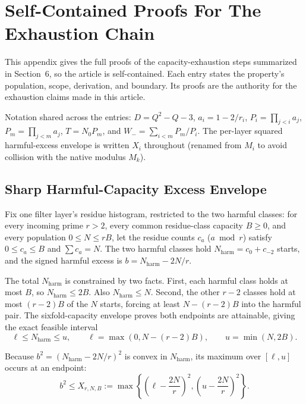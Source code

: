 \section{Self-Contained Proofs For The Exhaustion Chain}
\label{sec:appendix-c-proofs}

This appendix gives the full proofs of the capacity-exhaustion steps
summarized in Section~6, so the article is self-contained. Each entry states the
property's population, scope, derivation, and boundary. Its proofs are the
authority for the exhaustion claims made in this article.

Notation shared across the entries: $D=Q^2-Q-3$, $a_i=1-2/r_i$,
$P_i=\prod_{j<i}a_j$, $P_m=\prod_{j<m}a_j$, $T=N_0P_m$, and
$W_-=\sum_{i<m}P_m/P_i$. The per-layer squared harmful-excess envelope is
written $X_i$ throughout (renamed from $M_i$ to avoid collision with the native modulus $M_k$).

\subsection{Sharp Harmful-Capacity Excess Envelope}
\label{sec:appendix-c-1}

Fix one filter layer's residue histogram, restricted to the two harmful
classes: for every incoming prime $r>2$, every common residue-class capacity
$B\ge0$, and every population $0\le N\le rB$, let the residue counts $c_a$
($a\bmod r$) satisfy $0\le c_a\le B$ and $\sum c_a=N$. The two harmful
classes hold $N_{\text{harm}}=c_0+c_{-2}$ starts, and the signed harmful
excess is $b=N_{\text{harm}}-2N/r$.

The total $N_{\text{harm}}$ is constrained by two facts. First, each harmful
class holds at most $B$, so $N_{\text{harm}}\le 2B$. Also
$N_{\text{harm}}\le N$. Second, the other $r-2$ classes hold at most
$(r-2)B$ of the $N$ starts, forcing at least $N-(r-2)B$ into the harmful
pair. The sixfold-capacity envelope proves both endpoints are attainable,
giving the exact feasible interval
\begin{equation*}
\ell\le N_{\text{harm}}\le u,
\qquad
\ell=\max(0,N-(r-2)B),
\qquad
u=\min(N,2B).
\end{equation*}

Because $b^2=(N_{\text{harm}}-2N/r)^2$ is convex in $N_{\text{harm}}$, its
maximum over $[\ell,u]$ occurs
at an endpoint:
\begin{equation*}
b^2
\le
X_{r,N,B}
:=
\max\left\{
\left(\ell-\frac{2N}{r}\right)^2,
\left(u-\frac{2N}{r}\right)^2
\right\}.
\end{equation*}

